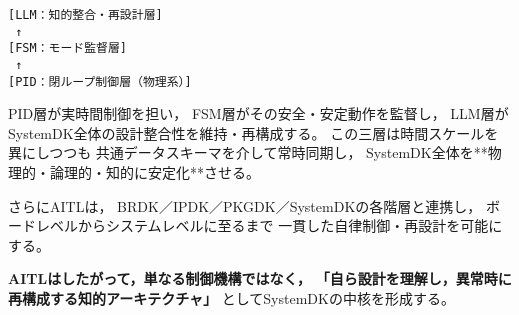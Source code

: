 \begin{center}
\texttt{[LLM：知的整合・再設計層]}\\
\texttt{     ↑}\\
\texttt{[FSM：モード監督層]}\\
\texttt{     ↑}\\
\texttt{[PID：閉ループ制御層（物理系）]}
\end{center}

PID層が実時間制御を担い，
FSM層がその安全・安定動作を監督し，
LLM層がSystemDK全体の設計整合性を維持・再構成する。
この三層は時間スケールを異にしつつも
共通データスキーマを介して常時同期し，
SystemDK全体を**物理的・論理的・知的に安定化**させる。

さらにAITLは，
BRDK／IPDK／PKGDK／SystemDKの各階層と連携し，
ボードレベルからシステムレベルに至るまで
一貫した自律制御・再設計を可能にする。

\textbf{AITLはしたがって，単なる制御機構ではなく，}
\textbf{「自ら設計を理解し，異常時に再構成する知的アーキテクチャ」}
としてSystemDKの中核を形成する。
